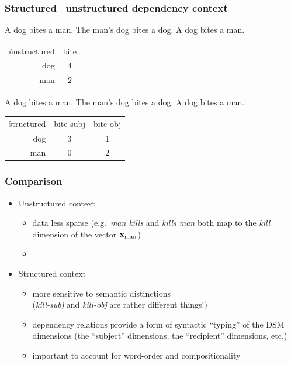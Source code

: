 \documentclass[t]{beamer} %
\begin{document}
\begin{frame}
  \frametitle{Structured \vs\ unstructured dependency context}

  A dog bites a man. The man's dog bites a dog.  A dog bites a man.
  
  \begin{center}
    \begin{tabular}{r|c}
      \h{unstructured} &  bite \\
      dog & 4 \\
      man & 2 
    \end{tabular}
  \end{center}

  \gap[2]\pause
  A dog bites a man. The man's dog bites a dog.  A dog bites a man.
  
   \begin{center}
     \begin{tabular}{r|c|c}
       \h{structured} &  bite-subj & bite-obj \\
       dog & 3 & 1 \\
       man & 0  & 2
     \end{tabular}
   \end{center}
\end{frame}


\begin{frame}
  \frametitle{Comparison}

  \begin{itemize}
  \item Unstructured context
    \begin{itemize}
    \item data less sparse (e.g.\ \emph{man kills} and \emph{kills man} both
      map to the \emph{kill} dimension of the vector $\vx_{\text{man}}$)
    \item[]
    \end{itemize}
  \item Structured context
    \begin{itemize}
    \item more sensitive to semantic distinctions\\
      (\emph{kill-subj} and \emph{kill-obj} are rather different
      things!)
    \item dependency relations provide a form of syntactic ``typing''
      of the DSM dimensions (the ``subject'' dimensions, the
      ``recipient'' dimensions, etc.)
     \item important to account for word-order and compositionality 
    \end{itemize}
  \end{itemize}
\end{frame}
\end{document}
